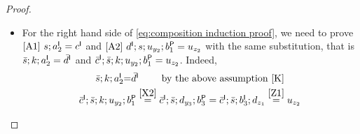 \begin{proof}
\begin{enumerate}
\begin{itemize}

\item For the right hand side of \eqref{eq:composition induction proof}, we need to prove $\eqref{A1}~s;a^{\mathsf I}_2=c^{\mathsf I}$ and $\eqref{A2}~d^{\mathsf I};s;u_{y_2};b^{\mathsf P}_1=u_{z_2}$ with the same substitution, that is $\bar s;k;a^{\mathsf I}_2=\bar d^{\mathsf I}$ and $\bar c^{\mathsf I};\bar s;k;u_{y_2};b^{\mathsf P}_1=u_{z_2}$. Indeed, 
\[\begin{array}{c}
\bar s;k;a^{\mathsf I}_2
{=} \bar d^{\mathsf I} \qquad \mbox{ by the above assumption \eqref{K}}\\[\smallskipamount]
\bar c^{\mathsf I};\bar s;k;u_{y_2};b^{\mathsf P}_1
\stackrel{\eqref{X2}}{=} \bar c^{\mathsf I};\bar s;d_{y_3};b^{\mathsf P}_3 
= \bar c^{\mathsf I};\bar s; b^{\mathsf I}_3; d_{z_1} 
\stackrel{\eqref{Z1}}{=} u_{z_2}
\end{array}\]
\end{itemize}
\end{enumerate}
\end{proof}
%
